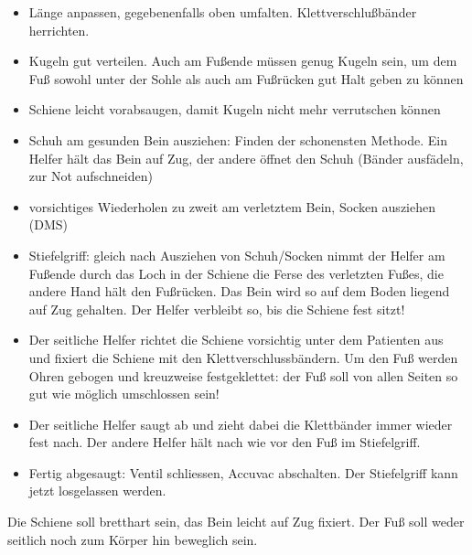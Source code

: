 \documentclass{article}
\begin{document}
\begin{itemize}
\item {\mdseries
L\"ange anpassen, gegebenenfalls oben umfalten.
Klettverschlu{\ss}b\"ander herrichten.}

\item {\mdseries
Kugeln gut verteilen. Auch am Fu{\ss}ende m\"ussen genug Kugeln sein, um
dem Fu{\ss} sowohl unter der Sohle als auch am Fu{\ss}r\"ucken gut Halt
geben zu k\"onnen}

\item {\mdseries
Schiene leicht vorabsaugen, damit Kugeln nicht mehr verrutschen
k\"onnen}

\item {\mdseries
Schuh am gesunden Bein ausziehen: Finden der schonensten Methode. Ein
Helfer h\"alt das Bein auf Zug, der andere \"offnet den Schuh (B\"ander
ausf\"adeln, zur Not aufschneiden)}

\item {\mdseries
vorsichtiges Wiederholen zu zweit am verletztem Bein, Socken ausziehen
(DMS)}

\item {\mdseries
Stiefelgriff: gleich nach Ausziehen von Schuh/Socken nimmt der Helfer am
Fu{\ss}ende durch das Loch in der Schiene die Ferse des verletzten
Fu{\ss}es, die andere Hand h\"alt den Fu{\ss}r\"ucken. Das Bein wird so
auf dem Boden liegend auf Zug gehalten. Der Helfer verbleibt so, bis
die Schiene fest sitzt!}

\item {\mdseries
Der seitliche Helfer richtet die Schiene vorsichtig unter dem Patienten
aus und fixiert die Schiene mit den Klettverschlussb\"andern. Um den
Fu{\ss} werden Ohren gebogen und kreuzweise festgeklettet: der Fu{\ss}
soll von allen Seiten so gut wie m\"oglich umschlossen sein!}

\item {\mdseries
Der seitliche Helfer saugt ab und zieht dabei die Klettb\"ander immer
wieder fest nach. Der andere Helfer h\"alt nach wie vor den Fu{\ss} im
Stiefelgriff.}

\item {\mdseries
Fertig abgesaugt: Ventil schliessen, Accuvac abschalten. Der
Stiefelgriff kann jetzt losgelassen werden.}

\end{itemize}
{
Die Schiene soll bretthart sein, das Bein leicht auf Zug fixiert. Der
Fu{\ss} soll weder seitlich noch zum K\"orper hin beweglich sein.}
\end{document}
